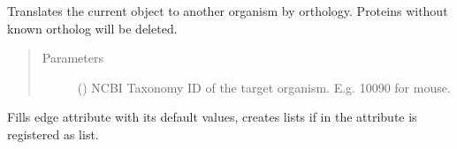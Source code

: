 \documentclass[letterpaper,10pt,english]{sphinxmanual}
\begin{document}
\begin{fulllineitems}

\begin{fulllineitems}
\label{\detokenize{main:pypath.main.PyPath.homology_translation}}
Translates the current object to another organism by orthology.
Proteins without known ortholog will be deleted.
\begin{quote}\begin{description}
\item[{Parameters}] \leavevmode
{} () \textendash{} NCBI Taxonomy ID of the target organism.
E.g. 10090 for mouse.

\end{description}\end{quote}

\end{fulllineitems}


\begin{fulllineitems}
\label{\detokenize{main:pypath.main.PyPath.htp_stats}}
\end{fulllineitems}


\begin{fulllineitems}
\label{\detokenize{main:pypath.main.PyPath.in_complex}}
\end{fulllineitems}


\begin{fulllineitems}
\label{\detokenize{main:pypath.main.PyPath.init_edge_attr}}
Fills edge attribute with its default values, creates
lists if in  the attribute is registered as list.

\end{fulllineitems}



\end{fulllineitems}
\end{document}
